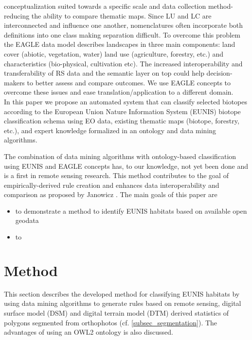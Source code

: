 \documentclass[authoryear, review,12pt,number]{elsarticle}
\begin{document}
conceptualization suited towards a specific scale and data collection method-
reducing the ability to compare thematic maps. Since LU and LC are
interconnected and influence one another, nomenclatures often incorporate both
definitions into one class making separation difficult. To overcome this problem
the EAGLE data model describes landscapes in three main components: land cover
(abiotic, vegetation, water) land use (agriculture, forestry, etc.) and
characteristics (bio-physical, cultivation etc). The increased interoperability
and transferability of RS data and the semantic layer on top could help
decision-makers to better assess and compare outcomes. We use EAGLE concepts to
overcome these issues and ease translation/application to a different
domain.
\\ 
In this paper we propose an automated system that can
classify selected biotopes according to the European Union Nature Information
System (EUNIS) biotope classification schema using EO data, existing
thematic maps (biotope, forestry, etc.), and expert knowledge formalized in an
ontology and data mining algorithms.


The combination of data mining algorithms with ontology-based classification
using EUNIS and EAGLE concepts has, to our knowledge, not yet been done and is a
first in remote sensing research. This method contributes to the goal of
empirically-derived rule creation and enhances data interoperability and
comparison as proposed by Janowicz \citep{Janowicz2012}.
The main goals of this paper are 
\begin{itemize}
 \item to demonstrate a method to identify EUNIS habitats based on available 
open geodata
 \item to
\end{itemize}

\section{Method}
This section describes the developed method for classifying EUNIS habitats by
using data mining algorithms to generate rules based on remote sensing, digital
surface model (DSM) and digital terrain model (DTM) derived statistics of
polygons segmented from orthophotos (cf. \ref{subsec_segmentation}). The
advantages of using an OWL2 ontology is also discussed.
\end{document}
